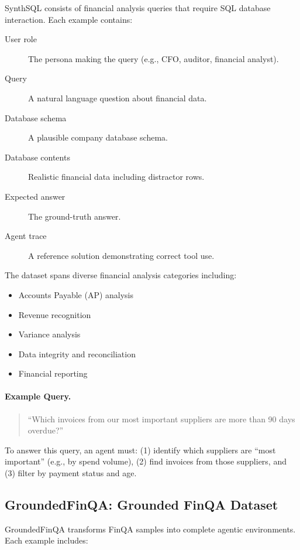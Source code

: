 \documentclass[11pt]{article}
\newcommand{\synthsubset}{SynthSQL\xspace}
\newcommand{\groundedfinqa}{GroundedFinQA\xspace}
\begin{document}
\synthsubset consists of financial analysis queries that require SQL database interaction. Each example contains:

\begin{description}
    \item[User role] The persona making the query (e.g., CFO, auditor, financial analyst).
    \item[Query] A natural language question about financial data.
    \item[Database schema] A plausible company database schema.
    \item[Database contents] Realistic financial data including distractor rows.
    \item[Expected answer] The ground-truth answer.
    \item[Agent trace] A reference solution demonstrating correct tool use.
\end{description}

The dataset spans diverse financial analysis categories including:
\begin{itemize}
    \item Accounts Payable (AP) analysis
    \item Revenue recognition
    \item Variance analysis
    \item Data integrity and reconciliation
    \item Financial reporting
\end{itemize}

\paragraph{Example Query.}
\begin{quote}
\small
``Which invoices from our most important suppliers are more than 90 days overdue?''
\end{quote}

To answer this query, an agent must: (1) identify which suppliers are ``most important'' (e.g., by spend volume), (2) find invoices from those suppliers, and (3) filter by payment status and age.

\subsection{\groundedfinqa: Grounded FinQA Dataset}
\label{sec:groundedfinqa}

\groundedfinqa transforms FinQA samples into complete agentic environments. Each example includes:
\end{document}

